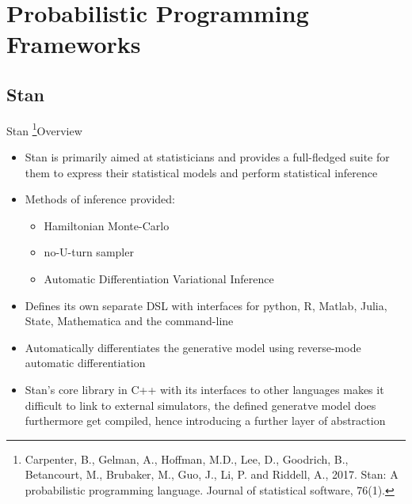 \documentclass[AERbeamer%
              ,optEnglish%
              ,optBiber%
              ,optBibstyleAlphabetic%
              ,optBeamerClassicFormat%
              ]{AERlatex}%
\begin{document}
\section{Probabilistic Programming Frameworks}


\subsection{Stan}
\begin{frame}[c]{Stan \footnote{Carpenter, B., Gelman, A., Hoffman, M.D., Lee, D.,
                                Goodrich, B., Betancourt, M., Brubaker, M., Guo, J., Li, P.
                                and Riddell, A., 2017. Stan: A probabilistic programming
                                language. Journal of statistical software, 76(1).}}{Overview}
    \centering
    \begin{itemize}
        \item Stan is primarily aimed at statisticians and provides a full-fledged suite for them
              to express their statistical models and perform statistical inference
        \item Methods of inference provided:
        \begin{itemize}
            \item Hamiltonian Monte-Carlo
            \item no-U-turn sampler
            \item Automatic Differentiation Variational Inference
        \end{itemize}
        \item Defines its own separate DSL with interfaces for python, R, Matlab, Julia, State, Mathematica and the command-line
        \item Automatically differentiates the generative model using reverse-mode automatic differentiation
        \item Stan's core library in C++ with its interfaces to other languages makes it difficult to link to
              external simulators, the defined generatve model does furthermore get compiled, hence introducing
              a further layer of abstraction
    \end{itemize}
\end{frame}
\end{document}
